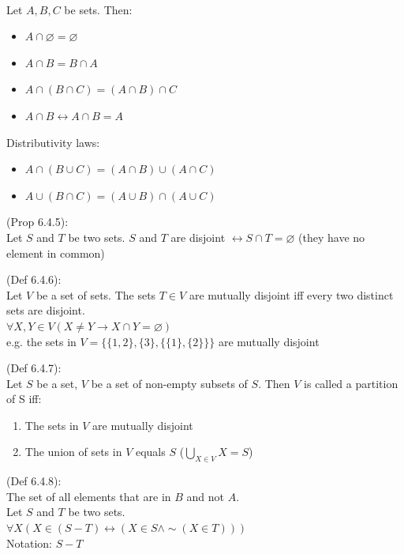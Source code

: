 \documentclass[10pt,landscape,a4paper]{article}
\newenvironment{descitemize} %
{\begin{description}[leftmargin=*,before=\let\makelabel\descitemlabel]}
{\end{description}}
\newcommand{\descitemlabel}[1]{%
\textbullet\ \textbf{#1}%
}
\begin{document}
\begin{multicols*}{4}
\begin{descitemize}
    \item [Prop 6.4.4] \leavevmode \\
    Let $A,B,C$ be sets. Then:
    \begin{itemize}
      \item $A \cap \varnothing = \varnothing$
      \item $A\cap B = B\cap A$
      \item $A\cap(B\cap C) = (A\cap B)\cap C$
      \item $A\cap B \leftrightarrow A\cap B=A$
    \end{itemize}
    Distributivity laws:
    \begin{itemize}
      \item $A\cap (B\cup C)=(A\cap B)\cup (A\cap C)$
      \item $A\cup (B\cap C)=(A\cup B)\cap (A\cup C)$
    \end{itemize}

    \item [Disjoint] (Prop 6.4.5):\\
    Let $S$ and $T$ be two sets. $S$ and $T$ are disjoint $\leftrightarrow S \cap T = \varnothing$ (they have no element in common)

    \item [Mutually Disjoint] (Def 6.4.6):\\
    Let $V$ be a set of sets. The sets $T \in V$ are mutually disjoint iff every two distinct sets are disjoint.\\
    $\forall X, Y \in V (X\neq Y \rightarrow X \cap Y = \varnothing)$\\
    e.g. the sets in $V=\{ \{1,2\},\{3\}, \{\{1\},\{2\}\} \}$ are mutually disjoint

    \item [Partition] (Def 6.4.7):\\
    Let $S$ be a set, $V$ be a set of non-empty subsets of $S$. Then $V$ is called a partition of S iff:
    \begin{enumerate}
      \item The sets in $V$ are mutually disjoint
      \item The union of sets in $V$ equals $S$ ($\bigcup\limits_{X\in V}^{}X=S$)
    \end{enumerate}

    \item [Non-symmetric difference] (Def 6.4.8):\\
    The set of all elements that are in $B$ and not $A$.\\
    Let $S$ and $T$ be two sets.\\
    $\forall X(X \in (S-T) \leftrightarrow (X\in S \land \sim(X\in T)))$\\
    Notation: $S - T$


\end{descitemize}
\end{multicols*}
\end{document}
